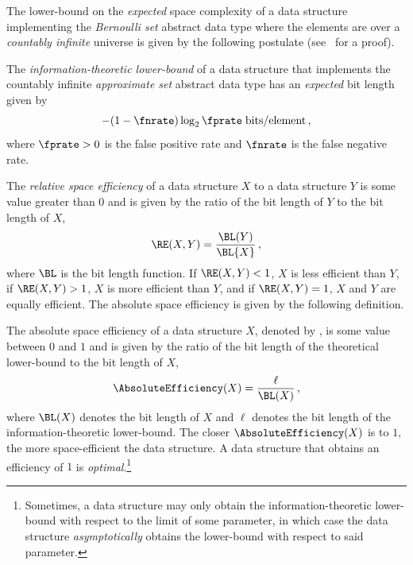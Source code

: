 \documentclass[ ../main.tex]{subfiles}
\begin{document}
The lower-bound on the \emph{expected} space complexity of a data structure
implementing the \emph{Bernoulli set} abstract data type where the elements
are over a \emph{countably infinite} universe is given by the following
postulate (see~\cite{bsets} for a proof).
\begin{postulate}
\label{pst:approx_l_b}
The \emph{information-theoretic lower-bound} of a data structure that implements the countably infinite 
\emph{approximate set} abstract data type has an \emph{expected} bit length 
given by
\begin{equation}
    -(1 - \fnrate) \log_2 \fprate \; \si{bits \per element}\,,
\end{equation}
where $\fprate > 0$ is the false positive rate and 
$\fnrate$ is the false negative rate.
\end{postulate}

The \emph{relative space efficiency} of a data 
structure $X$ to a data structure $Y$ is some value 
greater than $0$ and is given by the ratio of the bit length of $Y$ to the bit 
length of $X$,
\begin{equation}
    \RE(X,Y) = \frac{\BL(Y)}{\BL{X}}\,,
\end{equation}
where $\BL$ is the bit length function. If $\RE(X,Y) < 1$, $X$ is less efficient 
than $Y$, if $\RE(X,Y) > 1$, $X$ is more efficient than $Y$, and if 
$\RE(X,Y) = 1$, $X$ and $Y$ are equally efficient. The absolute space efficiency 
is given by the following definition.
\begin{definition}
The absolute space efficiency of a data structure $X$, denoted by 
, is some value between $0$ and $1$ and is given by the 
ratio of the bit length of the theoretical lower-bound to the bit length of $X$,
\begin{equation}
    \AbsoluteEfficiency(X) = \frac{\ell}{\BL(X)}\,,
\end{equation}
where $\BL(X)$ denotes the bit length of $X$ and $\ell$ denotes the bit length 
of the information-theoretic lower-bound. The closer $\AbsoluteEfficiency(X)$ is 
to $1$, the more space-efficient the data structure. A data structure that 
obtains an efficiency of $1$ is \emph{optimal}.\footnote{Sometimes, a data 
structure may only obtain the information-theoretic lower-bound with respect to 
the limit of some parameter, in which case the data structure 
\emph{asymptotically} obtains the lower-bound with respect to said parameter.}
\end{definition}
\end{document}
